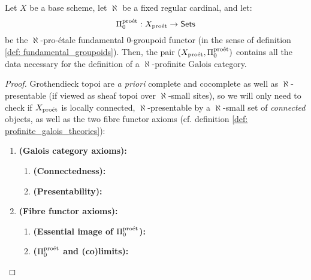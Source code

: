                 \begin{theorem} \label{theorem: profinite_galois_theories}
                    Let $X$ be a base scheme, let $\aleph$ be a fixed regular cardinal, and let:
                        $$\Pi_0^{\mathrm{pro\acute{e}t}}: X_{\mathrm{pro\acute{e}t}} \to \mathsf{Sets}$$
                    be the $\aleph$-pro-\'etale fundamental $0$-groupoid functor (in the sense of definition \ref{def: fundamental_groupoids}). Then, the pair $(X_{\mathrm{pro\acute{e}t}}, \Pi_0^{\mathrm{pro\acute{e}t}})$ contains all the data necessary for the definition of a $\aleph$-profinite Galois category.
                \end{theorem}
                    \begin{proof}
                        Grothendieck topoi are \textit{a priori} complete and cocomplete as well as $\aleph$-presentable (if viewed as sheaf topoi over $\aleph$-small sites), so we will only need to check if $X_{\mathrm{pro\acute{e}t}}$ is locally connected, $\aleph$-presentable by a $\aleph$-small set of \textit{connected} objects, as well as the two fibre functor axioms (cf. definition \ref{def: profinite_galois_theories}):
                            \begin{enumerate}
                                \item \textbf{(Galois category axioms):}
                                    \begin{enumerate}
                                        \item \textbf{(Connectedness):}
                                        \item \textbf{(Presentability):}
                                    \end{enumerate}
                                \item \textbf{(Fibre functor axioms):}
                                    \begin{enumerate}
                                        \item \textbf{(Essential image of $\Pi_0^{\mathrm{pro\acute{e}t}}$):} 
                                        \item \textbf{($\Pi_0^{\mathrm{pro\acute{e}t}}$ and (co)limits):}
                                    \end{enumerate}
                            \end{enumerate}
                    \end{proof}
                    
